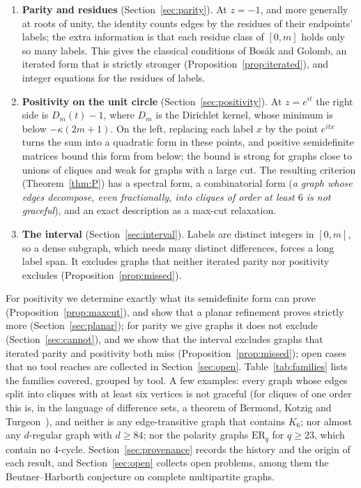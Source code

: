 \documentclass[11pt]{amsart}
\theoremstyle{tplain}
\theoremstyle{tdefinition}
\theoremstyle{tremark}
\begin{document}
\begin{enumerate}[label=\textbf{\Roman*.}]
\item \textbf{Parity and residues} (Section~\ref{sec:parity}). At $z=-1$, and
  more generally at roots of unity, the identity counts edges by the residues
  of their endpoints' labels; the extra information is that each residue class
  of $[0,m]$ holds only so many labels. This gives the classical conditions of
  Bos\'ak and Golomb, an iterated form that is strictly stronger
  (Proposition~\ref{prop:iterated}), and integer equations for the residues of
  labels.
\item \textbf{Positivity on the unit circle} (Section~\ref{sec:positivity}).
  At $z=e^{it}$ the right side is $D_m(t)-1$, where $D_m$ is the Dirichlet
  kernel, whose minimum is below $-\kappa(2m+1)$. On the left, replacing each label $x$ by the point $e^{itx}$ turns the
  sum into a quadratic form in these points, and positive semidefinite matrices bound this form from below; the bound
  is strong for graphs close to unions of cliques and weak for graphs with a
  large cut. The
  resulting criterion
  (Theorem~\ref{thm:P}) has a spectral form, a combinatorial form (\emph{a
  graph whose edges decompose, even fractionally, into cliques of order at
  least $6$ is not graceful}), and an exact description as a max-cut
  relaxation.
\item \textbf{The interval} (Section~\ref{sec:interval}). Labels are distinct
  integers in $[0,m]$, so a dense subgraph, which needs many distinct
  differences, forces a long label span. It excludes graphs that neither iterated parity nor positivity excludes
(Proposition~\ref{prop:missed}).
\end{enumerate}

For positivity we determine exactly what its semidefinite form can prove
(Proposition~\ref{prop:maxcut}), and show that a planar refinement proves strictly more
(Section~\ref{sec:planar}); for parity we give graphs it does not exclude (Section~\ref{sec:cannot}),
and we show that the interval excludes graphs that iterated parity and
positivity both miss (Proposition~\ref{prop:missed}); open cases that no tool
reaches are collected in Section~\ref{sec:open}. Table~\ref{tab:families} lists the
families covered, grouped by tool. A few examples: every graph whose edges
split into cliques with at least six vertices is not graceful (for cliques
of one order this is, in the language of difference sets, a theorem of
Bermond, Kotzig and Turgeon~\cite{bkt}), and neither is
any edge-transitive graph that contains $K_6$; nor almost any $d$-regular graph
with $d\ge84$; nor the polarity graphs $\mathrm{ER}_q$ for $q\ge23$, which
contain no $4$-cycle. Section~\ref{sec:provenance} records the history
and the origin of each result, and Section~\ref{sec:open} collects open
problems, among them the Beutner--Harborth conjecture on complete
multipartite graphs.
\end{document}
